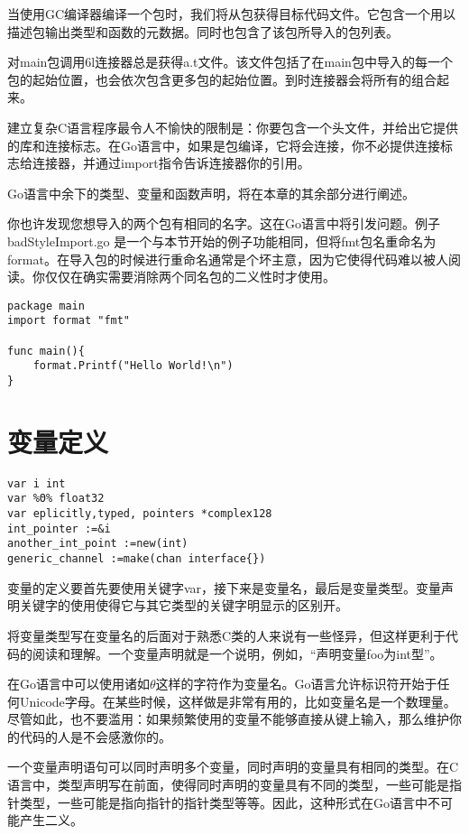 当使用GC编译器编译一个包时，我们将从包获得目标代码文件。它包含一个用以描述包输出类型和函数的元数据。同时也包含了该包所导入的包列表。

对main包调用6l连接器总是获得a.t文件。该文件包括了在main包中导入的每一个包的起始位置，也会依次包含更多包的起始位置。到时连接器会将所有的组合起来。

建立复杂C语言程序最令人不愉快的限制是：你要包含一个头文件，并给出它提供的库和连接标志。在Go语言中，如果是包编译，它将会连接，你不必提供连接标志给连接器，并通过import指令告诉连接器你的引用。

Go语言中余下的类型、变量和函数声明，将在本章的其余部分进行阐述。

你也许发现您想导入的两个包有相同的名字。这在Go语言中将引发问题。例子badStyleImport.go 是一个与本节开始的例子功能相同，但将fmt包名重命名为format。在导入包的时候进行重命名通常是个坏主意，因为它使得代码难以被人阅读。你仅仅在确实需要消除两个同名包的二义性时才使用。

\begin{lstlisting}
package main
import format "fmt"

func main(){
	format.Printf("Hello World!\n")
}
\end{lstlisting}

\section{变量定义}
\begin{lstlisting}[escapechar=\%]
var i int
var %Θ% float32
var eplicitly,typed, pointers *complex128
int_pointer :=&i 
another_int_point :=new(int)
generic_channel :=make(chan interface{})
\end{lstlisting}

变量的定义要首先要使用关键字var，接下来是变量名，最后是变量类型。变量声明关键字的使用使得它与其它类型的关键字明显示的区别开。

将变量类型写在变量名的后面对于熟悉C类的人来说有一些怪异，但这样更利于代码的阅读和理解。一个变量声明就是一个说明，例如，“声明变量foo为int型”。

在Go语言中可以使用诸如$\theta$这样的字符作为变量名。Go语言允许标识符开始于任何Unicode字母。在某些时候，这样做是非常有用的，比如变量名是一个数理量。尽管如此，也不要滥用：如果频繁使用的变量不能够直接从键上输入，那么维护你的代码的人是不会感激你的。

一个变量声明语句可以同时声明多个变量，同时声明的变量具有相同的类型。在C语言中，类型声明写在前面，使得同时声明的变量具有不同的类型，一些可能是指针类型，一些可能是指向指针的指针类型等等。因此，这种形式在Go语言中不可能产生二义。

